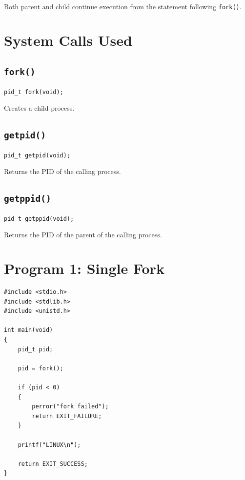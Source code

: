 \documentclass[12pt,a4paper]{report}
\begin{document}
Both parent and child continue execution from the statement following
\texttt{fork()}.

\section*{System Calls Used}

\subsection*{\texttt{fork()}}

\begin{verbatim}
pid_t fork(void);
\end{verbatim}

Creates a child process.

\subsection*{\texttt{getpid()}}

\begin{verbatim}
pid_t getpid(void);
\end{verbatim}

Returns the PID of the calling process.

\subsection*{\texttt{getppid()}}

\begin{verbatim}
pid_t getppid(void);
\end{verbatim}

Returns the PID of the parent of the calling process.


\section*{Program 1: Single Fork}

\begin{lstlisting}
#include <stdio.h>
#include <stdlib.h>
#include <unistd.h>

int main(void)
{
    pid_t pid;

    pid = fork();

    if (pid < 0)
    {
        perror("fork failed");
        return EXIT_FAILURE;
    }

    printf("LINUX\n");

    return EXIT_SUCCESS;
}
\end{lstlisting}
\end{document}
